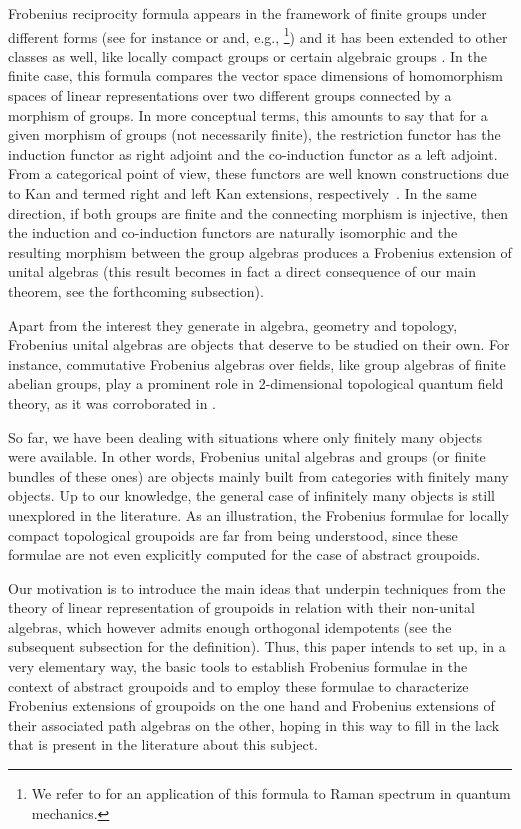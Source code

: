 \documentclass[pdftex]{sigma}
\numberwithin{equation}{section}
\begin{document}
Frobenius reciprocity formula appears in the framework of finite groups under different forms (see for instance \cite[equation~(3.4), p.~109]{Sternberg:1994} or \cite[equation~(3.7), p.~111]{Sternberg:1994} and, e.g., \cite[Proposition~2.3.9]{Kowalski:2014}\footnote{We refer to \cite[Section~3.6, p.~128]{Sternberg:1994} for an application of this formula to Raman spectrum in quantum mechanics.}) and it has been extended to other classes as well, like locally compact groups \cite{Mackey:1953, MooreC:1962} or certain algebraic groups \cite{Howe:1971}. In the finite case, this formula compares the vector space dimensions of homomorphism spaces of linear representations over two different groups connected by a morphism of groups. In more conceptual terms, this amounts to say that for a given morphism of groups (not necessarily finite), the restriction
functor has the induction functor as right adjoint and the co-induction functor as a left adjoint. From a categorical point of view, these functors are well known constructions due to Kan and termed right and left Kan extensions, respectively~\cite{MacLane}. In the same direction, if both groups are finite and the connecting morphism is injective, then the induction and co-induction functors are naturally isomorphic and the resulting morphism between the group algebras produces a Frobenius extension of unital algebras \cite{Kadison:1999} (this result becomes in fact a direct consequence of our main theorem, see the forthcoming subsection).

Apart from the interest they generate in algebra, geometry and topology, Frobenius unital algebras are objects that deserve to be studied on their own. For instance, commutative Frobenius algebras over fields, like group algebras of finite abelian groups, play a prominent role in 2-dimensional topological quantum field theory, as it was corroborated in \cite{Kock:2003}.

So far, we have been dealing with situations where only finitely many objects were available. In other words, Frobenius unital algebras and groups (or finite bundles of these ones) are objects mainly built from categories with finitely many objects. Up to our knowledge, the general case of infinitely many objects is still unexplored in the literature. As an illustration, the Frobenius formulae for locally compact topological groupoids are far from being understood, since these formulae are not even explicitly computed for the case of abstract groupoids.

 Our motivation is to introduce the main ideas that underpin techniques from the theory of linear representation of groupoids in relation with their non-unital algebras, which however admits enough orthogonal idempotents (see the subsequent subsection for the definition). Thus, this paper intends to set up, in a very elementary way, the basic tools to establish Frobenius formulae in the context of abstract groupoids and to employ these formulae to characterize Frobenius extensions of groupoids on the one hand and Frobenius extensions of their associated path algebras on the other, hoping in this way to fill in the lack that is present in the literature about this subject.
\end{document}
